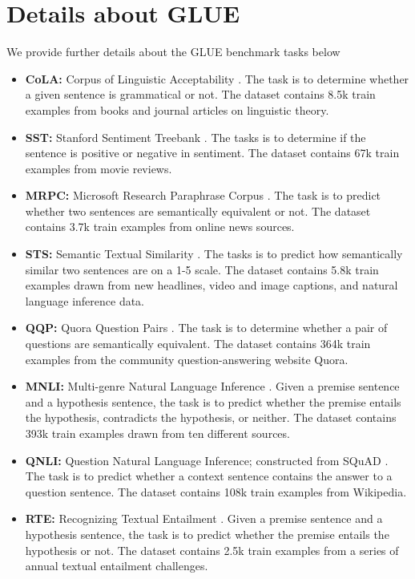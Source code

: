 \documentclass{article}
\begin{document}
\section{Details about GLUE}
\label{app:glue}
We provide further details about the GLUE benchmark tasks below
\begin{itemize}
    \item \textbf{CoLA:} Corpus of Linguistic Acceptability \citep{Warstadt2018NeuralNA}. The task is to determine whether a given sentence is grammatical or not. The dataset contains 8.5k train examples from books and journal articles on linguistic theory. 
    \item \textbf{SST:} Stanford Sentiment Treebank \citep{Socher2013RecursiveDM}. The tasks is to determine if the sentence is positive or negative in sentiment. The dataset contains 67k train examples from movie reviews.
    \item \textbf{MRPC:} Microsoft Research Paraphrase Corpus \citep{Dolan2005AutomaticallyCA}. The task is to predict whether two sentences are semantically equivalent or not. The dataset contains 3.7k train examples from online news sources.
    \item \textbf{STS:} Semantic Textual Similarity \citep{Cer2017SemEval2017T1}. The tasks is to predict how semantically similar two sentences are on a 1-5 scale. The dataset contains 5.8k train examples drawn from new headlines, video and image captions, and natural language inference data.
    \item \textbf{QQP:} Quora Question Pairs \citep{QQP}. The task is to determine whether a pair of questions are semantically equivalent. The dataset contains 364k train examples from the community question-answering website Quora.
    \item \textbf{MNLI:} Multi-genre Natural Language Inference \citep{Williams2018ABC}. Given a premise sentence and a hypothesis sentence, the task is to predict whether the premise entails the hypothesis, contradicts the hypothesis, or neither. The dataset contains 393k train examples drawn from ten different sources.
    \item \textbf{QNLI:} Question Natural Language Inference; constructed from SQuAD \citep{Rajpurkar2016SQuAD10}. The task is to predict whether a context sentence contains the answer to a question sentence. The dataset contains 108k train examples from Wikipedia.
    \item \textbf{RTE:} Recognizing Textual Entailment \citep{Giampiccolo2007TheTP}. Given a premise sentence and a hypothesis sentence, the task is to predict whether the premise entails the hypothesis or not. The dataset contains 2.5k train examples from a series of annual textual entailment challenges.
\end{itemize}
\end{document}
